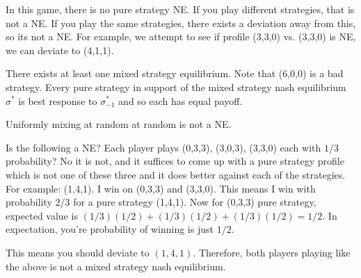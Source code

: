 \documentclass[psamsfonts]{amsart}
\begin{document}
In this game, there is no pure strategy NE. If you play different strategies, that is not a NE. If you play the same strategies, there exists a deviation away from this, so its not a NE. For example, we attempt to see if profile (3,3,0) vs. (3,3,0) is NE, we can deviate to (4,1,1).

There exists at least one mixed strategy equilibrium. Note that (6,0,0) is a bad strategy. Every pure strategy in support of the mixed strategy nash equilibrium $\sigma^*$ is best response to $\sigma_{-1}^*$ and so each has equal payoff.

Uniformly mixing at random at random is not a NE.

Is the following a NE? Each player plays (0,3,3), (3,0,3), (3,3,0) each with $1/3$ probability? No it is not, and it suffices to come up with a pure strategy profile which is not one of these three and it does better against each of the strategies. For example: (1,4,1). I win on (0,3,3) and (3,3,0). This means I win with probability 2/3 for a pure strategy (1,4,1). Now for (0,3,3) pure strategy, expected value is $(1/3)(1/2) + (1/3)(1/2) + (1/3)(1/2) = 1/2$. In expectation, you're probability of winning is just $1/2$.

This means you should deviate to $(1,4,1)$. Therefore, both players playing like the above is not a mixed strategy nash equilibrium.
\end{document}
